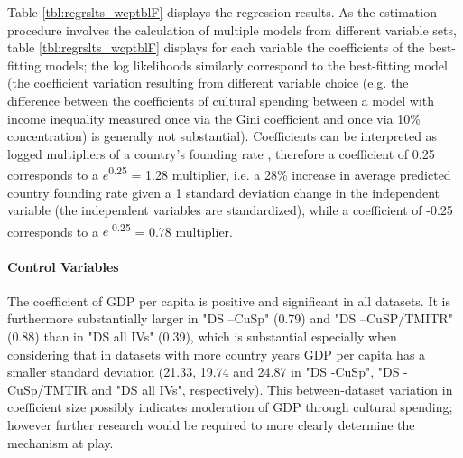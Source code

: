 \documentclass[11pt]{article}
\begin{document}
Table \ref{tbl:regrslts_wcptblF} displays the regression results. 
As the estimation procedure involves the calculation of multiple models from different variable sets, table \ref{tbl:regrslts_wcptblF} displays for each variable the coefficients of the best-fitting models; the log likelihoods similarly correspond to the best-fitting model (the coefficient variation resulting from different variable choice (e.g. the difference between the coefficients of cultural spending between a model with income inequality measured once via the Gini coefficient and once via 10\% concentration) is generally not substantial). 
Coefficients can be interpreted as logged multipliers of a country's founding rate \parencite{Coxe_West_Aiken_2009_count}, therefore a coefficient of 0.25 corresponds to a \(e\)\textsuperscript{0.25} = 1.28 multiplier, i.e. a 28\% increase in average predicted country founding rate given a 1 standard deviation change in the independent variable (the independent variables are standardized), while a coefficient of -0.25 corresponds to a \(e\)\textsuperscript{-0.25} = 0.78 multiplier.



\paragraph*{Control Variables}





The coefficient of GDP per capita is positive and significant in all datasets. 
It is furthermore substantially larger in "DS --CuSp" (0.79) and "DS --CuSP/TMITR" (0.88) than in "DS all IVs" (0.39), which is substantial especially when considering that in datasets with more country years GDP per capita has a smaller standard deviation (21.33, 19.74 and 24.87 in "DS -CuSp", "DS -CuSp/TMTIR and "DS all IVs", respectively).
This between-dataset variation in coefficient size possibly indicates moderation of GDP through cultural spending; however further research would be required to more clearly determine the mechanism at play. 
\end{document}
